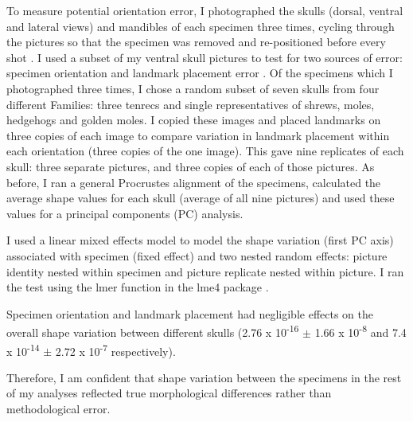 	To measure potential orientation error, I photographed the skulls (dorsal, ventral and lateral views) and mandibles of each specimen three times, cycling through the pictures so that the specimen was removed and re-positioned before every shot \citep{Viscosi2011}.
	I used a subset of my ventral skull pictures to test for two sources of error: specimen orientation and landmark placement error \citep{Arnqvist1998, Barrow2008}. Of the specimens which I photographed three times,  I chose a random subset of seven skulls from four different Families: three tenrecs and single representatives of shrews, moles, hedgehogs and golden moles. I copied these images and placed landmarks on three copies of each image to compare variation in landmark placement within each orientation (three copies of the one image). This gave nine replicates of each skull: three separate pictures, and three copies of each of those pictures. As before, I ran a general Procrustes alignment \citep{Rohlf1993} of the specimens, calculated the average shape values for each skull (average of all nine pictures) and used these values for a principal components (PC) analysis. 
		
	I used a linear mixed effects model to model the shape variation (first PC axis) associated with specimen (fixed effect) and two nested random effects: picture identity nested within specimen and picture replicate nested within picture. I ran the test using the lmer function in the lme4 package \citep{Bates2014}. %

	Specimen orientation and landmark placement had negligible effects on the overall shape variation between different skulls (2.76 x 10\textsuperscript{-16} $\pm$ 1.66 x 10\textsuperscript{-8} and 7.4 x 10\textsuperscript{-14} $\pm$ 2.72 x 10\textsuperscript{-7} respectively). %
	
	Therefore, I am confident that shape variation between the specimens in the rest of my analyses reflected true morphological differences rather than methodological error.







